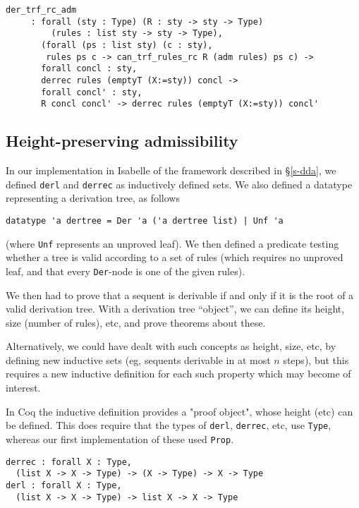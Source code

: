 \documentclass[a4paper,12pt]{llncs}
\begin{document}
\begin{theorem}\label{t-der-trf-rc-adm}
\end{theorem}
\begin{verbatim}
der_trf_rc_adm
     : forall (sty : Type) (R : sty -> sty -> Type)
         (rules : list sty -> sty -> Type),
       (forall (ps : list sty) (c : sty),
        rules ps c -> can_trf_rules_rc R (adm rules) ps c) ->
       forall concl : sty,
       derrec rules (emptyT (X:=sty)) concl ->
       forall concl' : sty,
       R concl concl' -> derrec rules (emptyT (X:=sty)) concl'
\end{verbatim}

\subsection{Height-preserving admissibility}

In our implementation in Isabelle of the framework described in 
\S\ref{s-dda}, we defined \texttt{derl} and \texttt{derrec} as inductively
defined sets.  
We also defined a datatype representing a derivation tree, as follows
\begin{verbatim}
datatype 'a dertree = Der 'a ('a dertree list) | Unf 'a 
\end{verbatim}

(where \texttt{Unf} represents an unproved leaf).
We then defined a predicate testing whether a tree is valid according to
a set of rules (which requires no unproved leaf,
and that every \texttt{Der}-node is one of the given rules).

We then had to prove that a sequent is derivable if and only if it is the
root of a valid derivation tree.
With a derivation tree ``object'', we can define its height, size (number of
rules), etc, and prove theorems about these.

Alternatively, we could have dealt with such concepts as height, size, etc,
by defining new inductive sets (eg, sequents derivable in at most $n$ steps),
but this requires a new inductive definition for each such property which may
become of interest.

In Coq the inductive definition provides a "proof object", whose height (etc)
can be defined. This does require that the types of   
\texttt{derl}, \texttt{derrec}, etc, use \texttt{Type},
whereas our first implementation of these used \texttt{Prop}.

\begin{verbatim}
derrec : forall X : Type,
  (list X -> X -> Type) -> (X -> Type) -> X -> Type
derl : forall X : Type,
  (list X -> X -> Type) -> list X -> X -> Type 
\end{verbatim}
\end{document}
